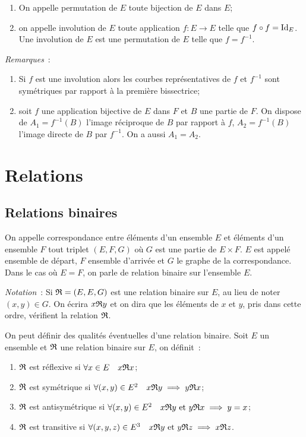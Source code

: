 %
\begin{defdef}
\begin{enumerate}
\item On appelle permutation de \(E\) toute bijection de \(E\) dans \(E\);
\item on appelle involution de \(E\) toute application \(f: E \longrightarrow E\) telle que \(f \circ f=\operatorname{Id}_E\). Une involution de \(E\) est une permutation de \(E\) telle que \(f=f^{-1}\).
\end{enumerate}
\end{defdef}
%
\emph{Remarques}~:
\begin{enumerate}
\item Si \(f\) est une involution alors les courbes représentatives de \(f\) et \(f^{-1}\) sont symétriques par rapport à la première bissectrice;
\item soit \(f\) une application bijective de \(E\) dans \(F\) et \(B\) une partie de \(F\). On dispose de \(A_1=f^{-1}(B)\) l'image réciproque de \(B\) par rapport à \(f\), \(A_2=f^{-1}(B)\) l'image directe de \(B\) par \(f^{-1}\). On a aussi \(A_1=A_2\).
\end{enumerate}
%
\section{Relations}
\label{chap3-sec:relations}
\subsection{Relations binaires}
\label{chap3-subsec:relationbinaire}
\begin{defdef}
On appelle correspondance entre éléments d'un ensemble \(E\) et éléments d'un ensemble \(F\) tout triplet \((E,F,G)\) où \(G\) est une partie de \(E \times F\). \(E\) est appelé ensemble de départ, \(F\) ensemble d'arrivée et \(G\) le graphe de la correspondance. Dans le cas où \(E=F\), on parle de relation binaire sur l'ensemble \(E\).
\end{defdef}
%
\emph{Notation}~: Si \(\mathfrak{R}=(E,E,G)\) est une relation binaire sur \(E\), au lieu de noter \((x,y) \in G\). On écrira \(x\mathfrak{R}{}y\) et on dira que les éléments de \(x\) et \(y\), pris dans cette ordre, vérifient la relation \(\mathfrak{R}\).
\begin{defdef}
On peut définir des qualités éventuelles d'une relation binaire. Soit \(E\) un ensemble et \(\mathfrak{R}{}\) une relation binaire sur \(E\), on définit~:
\begin{enumerate}
\item \(\mathfrak{R}{}\) est réflexive si \(\forall x \in E \quad x\mathfrak{R}{}x\);
\item \(\mathfrak{R}{}\) est symétrique si \(\forall (x,y) \in E^2 \quad x\mathfrak{R}{}y \implies y\mathfrak{R}{}x\);
\item \(\mathfrak{R}{}\) est antisymétrique si \(\forall (x,y) \in E^2 \quad x\mathfrak{R}{}y \text{~et~} y\mathfrak{R}{}x \implies y=x\);
\item \(\mathfrak{R}{}\) est transitive si \(\forall (x,y,z) \in E^3 \quad x\mathfrak{R}{}y \text{~et~} y\mathfrak{R}{}z \implies x\mathfrak{R}{}z\).
\end{enumerate}
\end{defdef}
%
